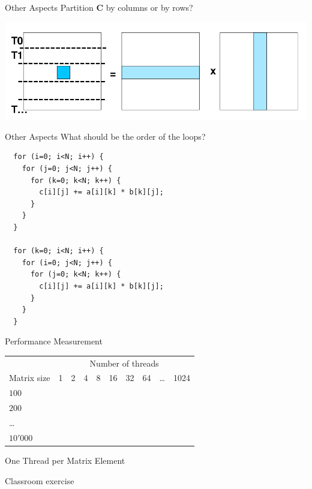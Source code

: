 \begin{frame}{Other Aspects}
  Partition $\mathbf{C}$ by columns or by rows?


 \includegraphics[width=\textwidth]{figures/matrix-4}
\end{frame}

\begin{frame}[fragile]{Other Aspects}
  What should be the order of the loops?


\begin{lstlisting}
  for (i=0; i<N; i++) {
    for (j=0; j<N; j++) {
      for (k=0; k<N; k++) {
        c[i][j] += a[i][k] * b[k][j];
      }
    }
  }

  for (k=0; i<N; i++) {
    for (i=0; j<N; j++) {
      for (j=0; k<N; k++) {
        c[i][j] += a[i][k] * b[k][j];
      }
    }
  }
\end{lstlisting}
\end{frame}

\begin{frame}{Performance Measurement}
  \begin{center}
    \begin{tabular}{l||c|c|c|c|c|c|c|c|c}
      & \multicolumn{9}{c}{Number of threads} \\
      Matrix size & 1 & 2 & 4 & 8 & 16 & 32 & 64 & \ldots & 1024 \\\hline\hline
      $100$ & & & & & & & & & \\\hline
      $200$ & & & & & & & & & \\\hline
      \ldots & & & & & & & & & \\\hline
      $10'000$ & & & & & & & & & \\\hline
    \end{tabular}
  \end{center}
\end{frame}

\begin{frame}{One Thread per Matrix Element}
  \begin{center}
    {\huge Classroom exercise}
  \end{center}
\end{frame}

